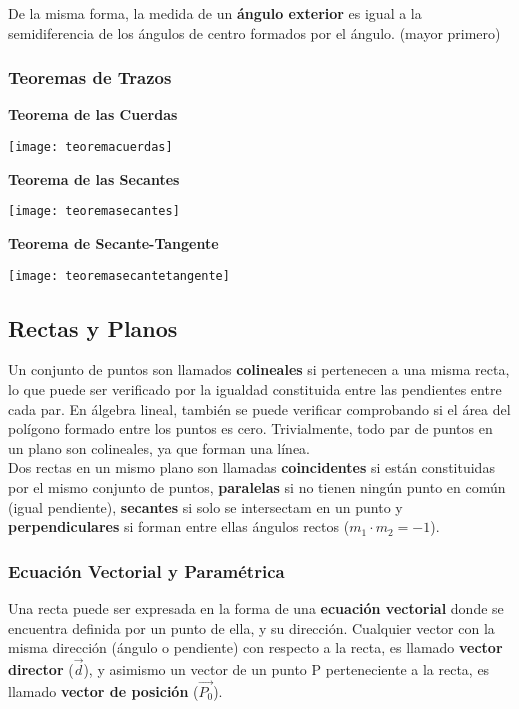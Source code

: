 De la misma forma, la medida de un \textbf{ángulo exterior} es igual a la semidiferencia de los ángulos de centro formados por el ángulo. (mayor primero)\\

\vfill\null\columnbreak
\subsubsection{Teoremas de Trazos}
\textbf{Teorema de las Cuerdas}\\

\begin{center}
\texttt{[image: teoremacuerdas]}
\end{center}
\textbf{Teorema de las Secantes}\\
\begin{center}
\texttt{[image: teoremasecantes]}
\end{center}
\textbf{Teorema de Secante-Tangente}\\
\begin{center}
\texttt{[image: teoremasecantetangente]}
\end{center}

\subsection{Rectas y Planos}
Un conjunto de puntos son llamados \textbf{colineales} si pertenecen a una misma recta, lo que puede ser verificado por la igualdad constituida entre las pendientes entre cada par. En álgebra lineal, también se puede verificar comprobando si el área del polígono formado entre los puntos es cero. Trivialmente, todo par de puntos en un plano son colineales, ya que forman una línea.\\

Dos rectas en un mismo plano son llamadas \textbf{coincidentes} si están constituidas por el mismo conjunto de puntos, \textbf{paralelas} si no tienen ningún punto en común (igual pendiente), \textbf{secantes} si solo se intersectam en un punto y \textbf{perpendiculares} si forman entre ellas ángulos rectos ($m_1 \cdot m_2 = -1$).\\

\subsubsection{Ecuación Vectorial y Paramétrica}
Una recta puede ser expresada en la forma de una \textbf{ecuación vectorial} donde se encuentra definida por un punto de ella, y su dirección. Cualquier vector con la misma dirección (ángulo o pendiente) con respecto a la recta, es llamado \textbf{vector director} ($\vec{d}$), y asimismo un vector de un punto P perteneciente a la recta, es llamado \textbf{vector de posición} ($\vec{P_0}$).\\

